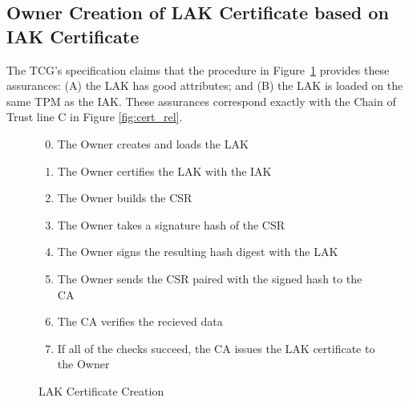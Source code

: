 \documentclass[runningheads]{llncs}
\begin{document}
\subsection{Owner Creation of LAK Certificate based on IAK Certificate}

The TCG's specification claims that the procedure in
Figure~\ref{fig:lak-certificate-creation} provides
these assurances: (A) the LAK has good attributes; and (B) the LAK is
loaded on the same TPM as the IAK. These assurances correspond exactly
with the Chain of Trust line C in Figure \ref{fig:cert_rel}.

\begin{figure}[hpbt]
\begin{enumerate}[itemsep=0pt,parsep=0pt,partopsep=0pt]
  \setcounter{enumi}{-1}
  \item The Owner creates and loads the LAK
  \item The Owner certifies the LAK with the IAK
  \item The Owner builds the CSR%
  \item The Owner takes a signature hash of the CSR
  \item The Owner signs the resulting hash digest with the LAK
  \item The Owner sends the CSR paired with the signed hash to the CA
  \item The CA verifies the recieved data%
  \item If all of the checks succeed, the CA issues the LAK certificate to the Owner
  \end{enumerate}
  \caption{LAK Certificate Creation}
  \label{fig:lak-certificate-creation}
\end{figure}
\end{document}
